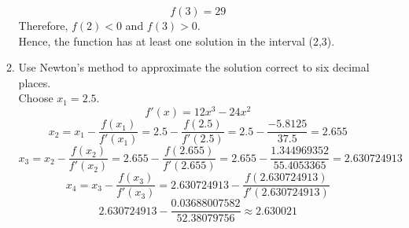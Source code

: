 \documentclass[12pt]{article}
\begin{document}
\begin{enumerate}
\begin{enumerate}
        \[f(3) = 29\]
        Therefore, $f(2) < 0$ and $f(3) > 0$.\\
        Hence, the function has at least one solution in the interval (2,3).
        \item Use Newton’s method to approximate the solution correct to six decimal places.\\
        Choose $x_1 = 2.5$.
        \[f'(x) = 12x^3 - 24x^2\]
        \[x_2 = x_1 - \frac{f(x_1)}{f'(x_1)} = 2.5 - \frac{f(2.5)}{f'(2.5)} = 2.5 - \frac{-5.8125}{37.5} = 2.655\]
        \[x_3 = x_2 - \frac{f(x_2)}{f'(x_2)} = 2.655 - \frac{f(2.655)}{f'(2.655)} = 2.655 - \frac{1.344969352}{55.4053365} = 2.630724913\]
        \[x_4 = x_3 - \frac{f(x_3)}{f'(x_3)} = 2.630724913 - \frac{f(2.630724913)}{f'(2.630724913)}\]
        \[ 2.630724913 - \frac{0.03688007582}{52.38079756} \approx 2.630021\]
        
    \end{enumerate}


\end{enumerate}
\end{document}
